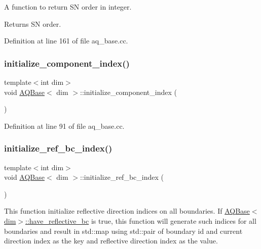 A function to return SN order in integer.

\begin{DoxyReturn}{Returns}
SN order. 
\end{DoxyReturn}


Definition at line 161 of file aq\+\_\+base.\+cc.

\mbox{\label{class_a_q_base_ab1cbcd2132328df15fb9651597e8ab48}} 
\subsubsection{\texorpdfstring{initialize\+\_\+component\+\_\+index()}{initialize\_component\_index()}}
{\footnotesize\ttfamily template$<$int dim$>$ \\
void \hyperlink{class_a_q_base}{A\+Q\+Base}$<$ dim $>$\+::initialize\+\_\+component\+\_\+index (\begin{DoxyParamCaption}{ }\end{DoxyParamCaption})\hspace{0.3cm}{\ttfamily [virtual]}}



Definition at line 91 of file aq\+\_\+base.\+cc.

\mbox{\label{class_a_q_base_aafde5b4c9ce19b1c6c4a8d37787f13b2}} 
\subsubsection{\texorpdfstring{initialize\+\_\+ref\+\_\+bc\+\_\+index()}{initialize\_ref\_bc\_index()}}
{\footnotesize\ttfamily template$<$int dim$>$ \\
void \hyperlink{class_a_q_base}{A\+Q\+Base}$<$ dim $>$\+::initialize\+\_\+ref\+\_\+bc\+\_\+index (\begin{DoxyParamCaption}{ }\end{DoxyParamCaption})\hspace{0.3cm}{\ttfamily [private]}}

This function initialize reflective direction indices on all boundaries. If \hyperlink{class_a_q_base_a8afa1e0da5bbb4846e495178e165b5b5}{A\+Q\+Base$<$dim$>$\+::have\+\_\+reflective\+\_\+bc} is true, this function will generate such indices for all boundaries and result in std\+::map using std\+::pair of boundary id and current direction index as the key and reflective direction index as the value.

